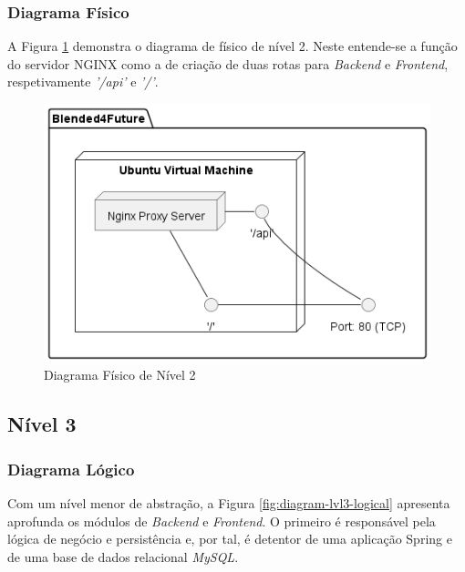\subsubsection{Diagrama Físico} 

A Figura \ref{fig:diagram-lvl2-physical} demonstra o diagrama de físico de nível 2. Neste entende-se a função do servidor \gls{NGINX} como a de criação de duas rotas para \textit{Backend} e \textit{Frontend}, respetivamente \textit{'/api'} e \textit{'/'}.

\begin{figure}[h!tbp]
    \centering
    \includegraphics[width=0.6\linewidth]{capitulos/cap3-analisedoproblema/assets/arquiteturasistema/physical/physical_l2.png}
    \caption{Diagrama Físico de Nível 2}
    \label{fig:diagram-lvl2-physical}
\end{figure}




\subsection{Nível 3}

\subsubsection{Diagrama Lógico}

Com um nível menor de abstração, a Figura \ref{fig:diagram-lvl3-logical} apresenta aprofunda os módulos de \textit{Backend} e \textit{Frontend}. O primeiro é responsável pela lógica de negócio e persistência e, por tal, é detentor de uma aplicação Spring e de uma base de dados relacional \textit{MySQL}.

